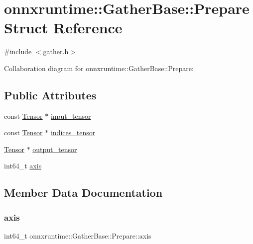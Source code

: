 \hypertarget{structonnxruntime_1_1GatherBase_1_1Prepare}{}\section{onnxruntime\+:\+:Gather\+Base\+:\+:Prepare Struct Reference}
\label{structonnxruntime_1_1GatherBase_1_1Prepare}


{\ttfamily \#include $<$gather.\+h$>$}



Collaboration diagram for onnxruntime\+:\+:Gather\+Base\+:\+:Prepare\+:
\subsection*{Public Attributes}
\begin{DoxyCompactItemize}
\item 
const \mbox{\hyperlink{classonnxruntime_1_1Tensor}{Tensor}} $\ast$ \mbox{\hyperlink{structonnxruntime_1_1GatherBase_1_1Prepare_a549c24ddeea986d5bd36b06b957ecdc6}{input\+\_\+tensor}}
\item 
const \mbox{\hyperlink{classonnxruntime_1_1Tensor}{Tensor}} $\ast$ \mbox{\hyperlink{structonnxruntime_1_1GatherBase_1_1Prepare_ab8cfdd4cbc8adf2b359dcb3a0e5977db}{indices\+\_\+tensor}}
\item 
\mbox{\hyperlink{classonnxruntime_1_1Tensor}{Tensor}} $\ast$ \mbox{\hyperlink{structonnxruntime_1_1GatherBase_1_1Prepare_afe6569d5637e1873ab0b2bee54360163}{output\+\_\+tensor}}
\item 
int64\+\_\+t \mbox{\hyperlink{structonnxruntime_1_1GatherBase_1_1Prepare_a3e63fae5d2f187c16e6483998b4eca92}{axis}}
\end{DoxyCompactItemize}


\subsection{Member Data Documentation}
\mbox{\label{structonnxruntime_1_1GatherBase_1_1Prepare_a3e63fae5d2f187c16e6483998b4eca92}} 
\subsubsection{\texorpdfstring{axis}{axis}}
{\footnotesize\ttfamily int64\+\_\+t onnxruntime\+::\+Gather\+Base\+::\+Prepare\+::axis}

